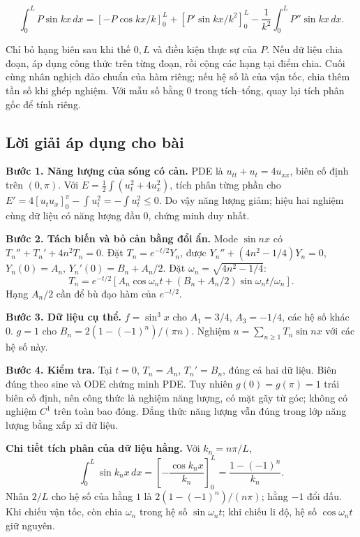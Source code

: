 \documentclass[10pt,a4paper]{article}
\begin{document}
\[
\int_0^L P\sin kx\,dx
=\left[-P\cos kx/k\right]_0^L+
\left[P'\sin kx/k^2\right]_0^L-
\frac1{k^2}\int_0^L P''\sin kx\,dx.
\]


Chỉ bỏ hạng biên sau khi thế $0,L$ và điều kiện thực sự của $P$. Nếu dữ liệu chia đoạn, áp dụng công thức trên từng đoạn, rồi cộng các hạng tại điểm chia. Cuối cùng nhân nghịch đảo chuẩn của hàm riêng; nếu hệ số là của vận tốc, chia thêm tần số khi ghép nghiệm. Với mẫu số bằng $0$ trong tích–tổng, quay lại tích phân gốc để tính riêng.
\subsection*{Lời giải áp dụng cho bài}
\textbf{Bước 1. Năng lượng của sóng có cản.} PDE là $u_{tt}+u_t=4u_{xx}$, biên cố định trên $(0,\pi)$. Với $E=\frac12\int(u_t^2+4u_x^2)$, tích phân từng phần cho $E'=4[u_tu_x]_0^\pi-\int u_t^2=-\int u_t^2\le0$. Do vậy năng lượng giảm; hiệu hai nghiệm cùng dữ liệu có năng lượng đầu $0$, chứng minh duy nhất.

\textbf{Bước 2. Tách biến và bỏ cản bằng đổi ẩn.} Mode $\sin nx$ có $T_n''+T_n'+4n^2T_n=0$. Đặt $T_n=e^{-t/2}Y_n$, được $Y_n''+(4n^2-1/4)Y_n=0$, $Y_n(0)=A_n$, $Y_n'(0)=B_n+A_n/2$. Đặt $\omega_n=\sqrt{4n^2-1/4}$:
\[T_n=e^{-t/2}[A_n\cos\omega_nt+(B_n+A_n/2)\sin\omega_nt/\omega_n].\]
Hạng $A_n/2$ cần để bù đạo hàm của $e^{-t/2}$.

\textbf{Bước 3. Dữ liệu cụ thể.} $f=\sin^3x$ cho $A_1=3/4$, $A_3=-1/4$, các hệ số khác $0$. $g=1$ cho $B_n=2(1-(-1)^n)/(\pi n)$. Nghiệm $u=\sum_{n\ge1}T_n\sin nx$ với các hệ số này.

\textbf{Bước 4. Kiểm tra.} Tại $t=0$, $T_n=A_n$, $T_n'=B_n$, đúng cả hai dữ liệu. Biên đúng theo sine và ODE chứng minh PDE. Tuy nhiên $g(0)=g(\pi)=1$ trái biên cố định, nên công thức là nghiệm năng lượng, có mặt gãy từ góc; không có nghiệm $C^1$ trên toàn bao đóng. Đẳng thức năng lượng vẫn đúng trong lớp năng lượng bằng xấp xỉ dữ liệu.

\textbf{Chi tiết tích phân của dữ liệu hằng.} Với $k_n=n\pi/L$,
\[\int_0^L\sin k_nx\,dx=\left[-\frac{\cos k_nx}{k_n}\right]_0^L=\frac{1-(-1)^n}{k_n}.\]
Nhân $2/L$ cho hệ số của hằng $1$ là $2(1-(-1)^n)/(n\pi)$; hằng $-1$ đổi dấu. Khi chiếu vận tốc, còn chia $\omega_n$ trong hệ số $\sin\omega_nt$; khi chiếu li độ, hệ số $\cos\omega_nt$ giữ nguyên.
\end{document}
